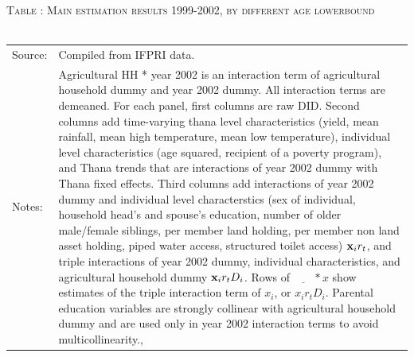 \documentclass[12pt,letterpaper]{article}\usepackage[margin=1in]{geometry}
\newcommand{\bfx}{\ensuremath{\mbox{\bf x}}}
\newcommand{\0}{\ensuremath{\mbox{\boldmath $0$}}}
\begin{document}
{\begin{table}\hfil\textsc{\footnotesize Table \thetable: Main estimation results 1999-2002, by different age lowerbound\label{MainByGenderByAgeLBResults}}\\\setlength{\tabcolsep}{.5pt}\renewcommand{\arraystretch}{.675}\hspace{-2em}\hfil\\\renewcommand{\arraystretch}{1}\hfil\begin{tabular}{>{\hfill\scriptsize}p{1cm}<{}>{\scriptsize}p{12cm}<{\hfill}} Source:& Compiled from IFPRI data. \\[-1ex] Notes:&   \textsf{Agricultural HH * year 2002} is an interaction term of agricultural household dummy and year 2002 dummy. All interaction terms are demeaned. For each panel, first columns are raw DID. Second columns add time-varying thana level characteristics (yield, mean rainfall, mean high temperature, mean low temperature), individual level characteristics (age squared, recipient of a poverty program), and \textsf{Thana trends} that are interactions of year 2002 dummy with Thana fixed effects. Third columns add interactions of year 2002 dummy and individual level characterstics (sex of individual, household head's and spouse's education, number of older male/female siblings, per member land holding, per member non land asset holding, piped water access, structured toilet access) $\bfx_{i}r_{t}$, and triple interactions of year 2002 dummy, individual characteristics, and agricultural household dummy $\bfx_{i}r_{t}D_{i}$. Rows of $\underline{\phantom{mm}}*x$ show estimates of the triple interaction term of $x_{i}$, or $x_{i}r_{t}D_{i}$. Parental education variables are strongly collinear with agricultural household dummy and are used only in year 2002 interaction terms to avoid multicollinearity., \\   \end{tabular} \end{table}


}
\end{document}
